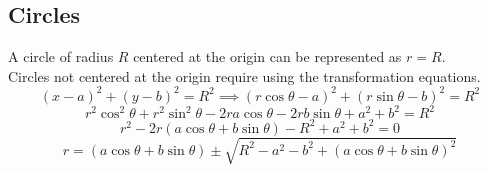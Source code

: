 \subsection{Circles}
\noindent
A circle of radius $R$ centered at the origin can be represented as $r = R$.\\
Circles not centered at the origin require using the transformation equations.
\begin{equation*}
	(x-a)^2 + (y-b)^2 = R^2 \implies (r\cos{\theta}-a)^2 + (r\sin{\theta}-b)^2 = R^2
\end{equation*}
\begin{equation*}
	r^2\cos^{2}{\theta} + r^2\sin^{2}{\theta} - 2ra\cos{\theta} - 2rb\sin{\theta} + a^2 + b^2 = R^2
\end{equation*}
\begin{equation*}
	r^2 - 2r(a\cos{\theta} + b\sin{\theta}) - R^2 + a^2 + b^2 = 0
\end{equation*}
\begin{equation*}
	r = (a\cos{\theta} + b\sin{\theta}) \pm \sqrt{R^2 - a^2 - b^2 + (a\cos{\theta} + b\sin{\theta})^2}
\end{equation*}